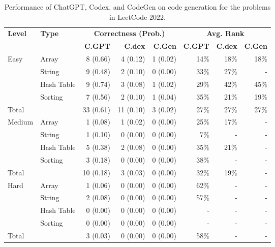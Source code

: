 \begin{table}[t]
	\centering
	\caption{Performance of ChatGPT, Codex, and CodeGen on code generation for the problems in LeetCode 2022.}
	\label{tab:code_generation_leetcode_2022}
	\resizebox{1\linewidth}{!}
	{
		\begin{tabular}{l|l|rrr|rrr}
			\toprule
			\multirow{2}{*}{\bf Level} & \multirow{2}{*}{\bf Type} & \multicolumn{3}{c|}{\bf Correctness (Prob.)} & \multicolumn{3}{c}{\bf Avg. Rank }\\\cline{3-8}
			& & {\bf C.GPT} & {\bf C.dex} & {\bf C.Gen} & {\bf C.GPT} & {\bf C.dex} & {\bf C.Gen} \\
			\hline
				\multirow{4}{*}{Easy}
			& Array & 8 (0.66) & 4 (0.12) & 1 (0.02) & 14\% & 18\% & 18\% \\
			& String & 9 (0.48) & 2 (0.10) & 0 (0.00) & 33\% & 27\% &  -  \\
			& Hash Table & 9 (0.74) & 3 (0.08) & 1 (0.02) & 29\% & 42\% & 45\% \\
			& Sorting & 7 (0.56) & 2 (0.10) & 1 (0.04) & 35\% & 21\% & 19\% \\
			\hline
			Total &  & 33 (0.61) & 11 (0.10) & 3 (0.02)  & 27\% & 27\% & 27\% \\
			\hline
				\multirow{4}{*}{Medium}
			& Array & 1 (0.08) & 1 (0.02) & 0 (0.00) & 25\% & 17\% &  -  \\
			& String & 1 (0.10) & 0 (0.00) & 0 (0.00) & 7\% &  -  &  -  \\
			& Hash Table & 5 (0.38) & 2 (0.08) & 0 (0.00) & 35\% & 21\% &  -  \\
			& Sorting & 3 (0.18) & 0 (0.00) & 0 (0.00) & 38\% &  -  &  -  \\
			\hline
			Total &  & 10 (0.18) & 3 (0.03) & 0 (0.00)  & 32\% & 19\% &  -  \\
			\hline
				\multirow{4}{*}{Hard}
			& Array & 1 (0.06) & 0 (0.00) & 0 (0.00) & 62\% &  -  &  -  \\
			& String & 2 (0.08) & 0 (0.00) & 0 (0.00) & 57\% &  -  &  -  \\
			& Hash Table & 0 (0.00) & 0 (0.00) & 0 (0.00) &  -  &  -  &  -  \\
			& Sorting & 0 (0.00) & 0 (0.00) & 0 (0.00) &  -  &  -  &  -  \\
			\hline
			Total &  & 3 (0.03) & 0 (0.00) & 0 (0.00)  & 58\% &  -  &  -  \\
			\bottomrule
		\end{tabular}
	}
\end{table}
